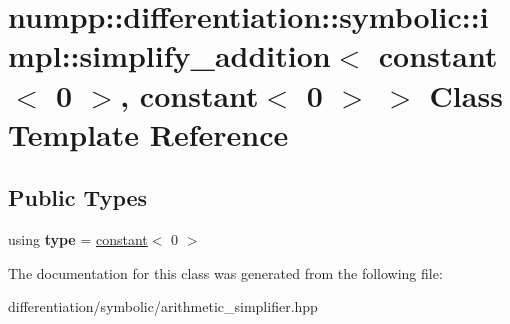 \hypertarget{classnumpp_1_1differentiation_1_1symbolic_1_1impl_1_1simplify__addition_3_01constant_3_010_01_4_00_01constant_3_010_01_4_01_4}{}\section{numpp\+:\+:differentiation\+:\+:symbolic\+:\+:impl\+:\+:simplify\+\_\+addition$<$ constant$<$ 0 $>$, constant$<$ 0 $>$ $>$ Class Template Reference}
\label{classnumpp_1_1differentiation_1_1symbolic_1_1impl_1_1simplify__addition_3_01constant_3_010_01_4_00_01constant_3_010_01_4_01_4}
\subsection*{Public Types}
\begin{DoxyCompactItemize}
\item 
\mbox{\label{classnumpp_1_1differentiation_1_1symbolic_1_1impl_1_1simplify__addition_3_01constant_3_010_01_4_00_01constant_3_010_01_4_01_4_a4e7b049212197040cf4276083299789a}} 
using {\bfseries type} = \hyperlink{classnumpp_1_1differentiation_1_1symbolic_1_1constant}{constant}$<$ 0 $>$
\end{DoxyCompactItemize}


The documentation for this class was generated from the following file\+:\begin{DoxyCompactItemize}
\item 
differentiation/symbolic/arithmetic\+\_\+simplifier.\+hpp\end{DoxyCompactItemize}
